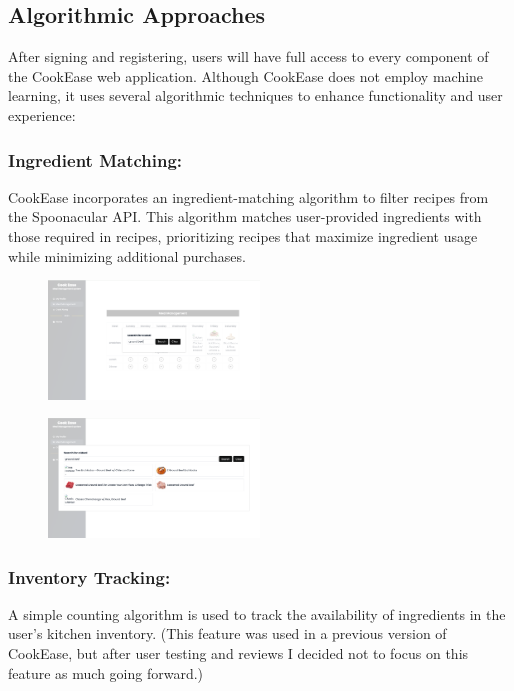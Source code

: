 \documentclass[10pt,twocolumn]{article}
\begin{document}
\subsection{Algorithmic Approaches}
After signing and registering, users will have full access to every component of the CookEase web application. Although CookEase does not employ machine learning, it uses several algorithmic techniques to enhance functionality and user experience:

\subsubsection{Ingredient Matching:}
CookEase incorporates an ingredient-matching algorithm to filter recipes from the Spoonacular API. This algorithm matches user-provided ingredients with those required in recipes, prioritizing recipes that maximize ingredient usage while minimizing additional purchases.

\begin{figure}[h!]
\includegraphics[width=0.5\textwidth]{images/Search.png}
\centering
\end{figure}
\begin{figure}[h!]
\includegraphics[width=0.5\textwidth]{images/SearchResults.png}
\centering
\end{figure} 

\subsubsection{Inventory Tracking:}
A simple counting algorithm is used to track the availability of ingredients in the user’s kitchen inventory. (This feature was used in a previous version of CookEase, but after user testing and reviews I decided not to focus on this feature as much going forward.)
\end{document}
